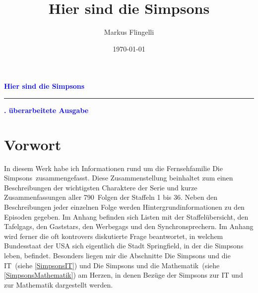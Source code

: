 \documentclass[pagesize,twoside,german]{scrbook}
\author{Markus Flingelli}
\date{\today}
\title{Hier sind die Simpsons}
\newcommand{\staffelAnzahl}{36}
\newcommand{\episodenAnzahl}{790}
\begin{document}
\setcounter{page}{1}

\def\datengerman{\def\today{\ifnum\day<10 0\fi\number\day.\ifnum\month<10 0\fi\number\month.\number\year}}

{}


\HTMLOutput{}
{
}

  
\HTMLOutput{
\maketitle
}
{
\vspace*{3ex}
\pagecolor{titleColor}\afterpage{\nopagecolor}
\vspace*{8cm}
\begin{flushleft}
  \Huge\textcolor{blue}{\textbf{\sffamily Hier sind die Simpsons}}\\
  \textcolor{blue}{\rule{\linewidth}{4pt}}
  \vspace{2ex}
  \huge\textcolor{blue}{\textbf{. überarbeitete Ausgabe}}
\end{flushleft}

\newpage
}

{}

\section*{Vorwort}
In diesem Werk habe ich Informationen rund um die Fernsehfamilie \glqq Die Simpsons\grqq\ zusammengefasst. Diese Zusammenstellung beinhaltet zum einen Beschreibungen der wichtigsten Charaktere der Serie und kurze Zusammenfassungen aller \episodenAnzahl\ Folgen der Staffeln 1 bis \staffelAnzahl . Neben den Beschreibungen jeder einzelnen Folge werden Hintergrundinformationen zu den Episoden gegeben. Im Anhang befinden sich Listen mit der Staffelübersicht, den Tafelgags, den Gaststars, den Werbegags und den Synchronsprechern. Im Anhang wird ferner die oft kontrovers diskutierte Frage beantwortet, in welchem Bundesstaat der USA sich eigentlich die Stadt Springfield, in der die Simpsons leben, befindet. Besonders liegen mir die Abschnitte \glqq Die Simpsons und die IT\grqq\ (siehe \ref{SimpsonsIT}) und \glqq Die Simpsons und die Mathematik\grqq\ (siehe \ref{SimpsonsMathematik}) am Herzen, in denen Bezüge der Simpsons zur IT und zur Mathematik dargestellt werden.
\end{document}
